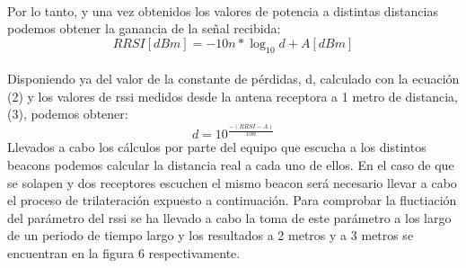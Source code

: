 \documentclass[a4paper ,12pt, onecolumn]{article}
\begin{document}
            \paragraph{}
            Por lo tanto, y una vez obtenidos los valores de potencia a distintas distancias podemos obtener la ganancia
            de la señal recibida:
            \begin{equation}
                RRSI [dBm] = -10n*\log_{10} d+ A[dBm]
            \end{equation}
            \paragraph{}
            Disponiendo ya del valor de la constante de pérdidas, d, calculado con la ecuación (2) y los valores
            de rssi medidos desde la antena receptora a 1 metro de distancia, (3), podemos obtener:
            \begin{equation}
                d= 10^\frac{-(RRSI - A)}{10n}
            \end{equation}
            Llevados a cabo los cálculos por parte del equipo que escucha a los distintos beacons podemos calcular la distancia 
            real a cada uno de ellos. En el caso de que se solapen y dos receptores escuchen el mismo beacon será necesario
            llevar a cabo el proceso de trilateración expuesto a continuación.
            Para comprobar la fluctiación del parámetro del rssi se ha llevado a cabo la toma de este parámetro a los largo de un 
            periodo de tiempo largo y los resultados a 2 metros y a 3 metros se encuentran en la figura 6 respectivamente. 
\end{document}
